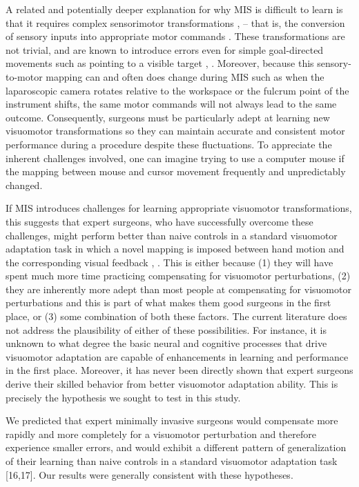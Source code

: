 \documentclass[jou, 11pt, longtable, floatsintext, notab]{apa6}
\begin{document}
A related and potentially deeper explanation for why MIS is
difficult to learn is that it requires complex sensorimotor
transformations
\cite{prinz_action_2013},\cite{prinz_tool_2013} -- that is,
the conversion of sensory inputs into appropriate motor
commands \cite{pouget_computational_2000}. These
transformations are not trivial, and are known to introduce
errors even for simple goal-directed movements such as
pointing to a visible target
\cite{soechting_errors_1989}, \cite{sober_flexible_2005}.
Moreover, because this sensory-to-motor mapping can and
often does change during MIS such as when the laparoscopic
camera rotates relative to the workspace or the fulcrum
point of the instrument shifts, the same motor commands will
not always lead to the same outcome. Consequently, surgeons
must be particularly adept at learning new visuomotor
transformations so they can maintain accurate and consistent
motor performance during a procedure despite these
fluctuations. To appreciate the inherent challenges
involved, one can imagine trying to use a computer mouse if
the mapping between mouse and cursor movement frequently and
unpredictably changed.

If MIS introduces challenges for learning appropriate
visuomotor transformations, this suggests that expert
surgeons, who have successfully overcome these challenges,
might perform better than naive controls in a standard
visuomotor adaptation task in which a novel mapping is
imposed between hand motion and the corresponding visual
feedback \cite{cunningham_aiming_1989},
\cite{sternad_motor_2009}. This is either because (1) they
will have spent much more time practicing compensating for
visuomotor perturbations, (2) they are inherently more adept
than most people at compensating for visuomotor
perturbations and this is part of what makes them good
surgeons in the first place, or (3) some combination of both
these factors. The current literature does not address the
plausibility of either of these possibilities. For instance,
it is unknown to what degree the basic neural and cognitive
processes that drive visuomotor adaptation are capable of
enhancements in learning and performance in the first place.
Moreover, it has never been directly shown that expert
surgeons derive their skilled behavior from better
visuomotor adaptation ability. This is precisely the
hypothesis we sought to test in this study.

We predicted that expert minimally invasive surgeons would
compensate more rapidly and more completely for a visuomotor
perturbation and therefore experience smaller errors, and
would exhibit a different pattern of generalization of their
learning than naive controls in a standard visuomotor
adaptation task [16,17]. Our results were generally
consistent with these hypotheses.
\end{document}
